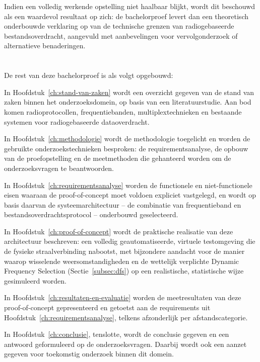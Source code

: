 Indien een volledig werkende opstelling niet haalbaar blijkt, wordt dit beschouwd als een
waardevol resultaat op zich: de bachelorproef levert dan een theoretisch onderbouwde verklaring
op van de technische grenzen van radiogebaseerde bestandsoverdracht, aangevuld met
aanbevelingen voor vervolgonderzoek of alternatieve benaderingen.

\section{}%
\label{sec:opzet-bachelorproef}


De rest van deze bachelorproef is als volgt opgebouwd:

In Hoofdstuk~\ref{ch:stand-van-zaken} wordt een overzicht gegeven van de stand van zaken
binnen het onderzoeksdomein, op basis van een literatuurstudie. Aan bod komen radioprotocollen,
frequentiebanden, multiplextechnieken en bestaande systemen voor radiogebaseerde dataoverdracht.

In Hoofdstuk~\ref{ch:methodologie} wordt de methodologie toegelicht en worden de gebruikte
onderzoekstechnieken besproken: de requirementsanalyse, de opbouw van de proefopstelling
en de meetmethoden die gehanteerd worden om de onderzoeksvragen te beantwoorden.

In Hoofdstuk~\ref{ch:requirementsanalyse} worden de functionele en niet-functionele eisen
waaraan de proof-of-concept moet voldoen expliciet vastgelegd, en wordt op basis daarvan de
systeemarchitectuur -- de combinatie van frequentieband en bestandsoverdrachtsprotocol --
onderbouwd geselecteerd.

In Hoofdstuk~\ref{ch:proof-of-concept} wordt de praktische realisatie van deze architectuur
beschreven: een volledig geautomatiseerde, virtuele testomgeving die de fysieke
straalverbinding nabootst, met bijzondere aandacht voor de manier waarop wisselende
weersomstandigheden en de wettelijk verplichte Dynamic Frequency Selection (Sectie~\ref{subsec:dfs})
op een realistische, statistische wijze gesimuleerd worden.

In Hoofdstuk~\ref{ch:resultaten-en-evaluatie} worden de meetresultaten van deze proof-of-concept
gepresenteerd en getoetst aan de requirements uit Hoofdstuk~\ref{ch:requirementsanalyse}, telkens
afzonderlijk per afstandscategorie.

In Hoofdstuk~\ref{ch:conclusie}, tenslotte, wordt de conclusie gegeven en een antwoord
geformuleerd op de onderzoeksvragen. Daarbij wordt ook een aanzet gegeven voor toekomstig
onderzoek binnen dit domein.